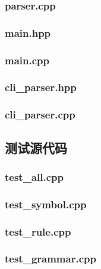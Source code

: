 \subsubsection{parser.cpp}


\subsubsection{main.hpp}


\subsubsection{main.cpp}


\subsubsection{cli\_parser.hpp}


 \subsubsection{cli\_parser.cpp}
 

 \subsection{测试源代码}
 \subsubsection{test\_all.cpp}
 

 \subsubsection{test\_symbol.cpp}
 

 \subsubsection{test\_rule.cpp}
 

 \subsubsection{test\_grammar.cpp}
 

